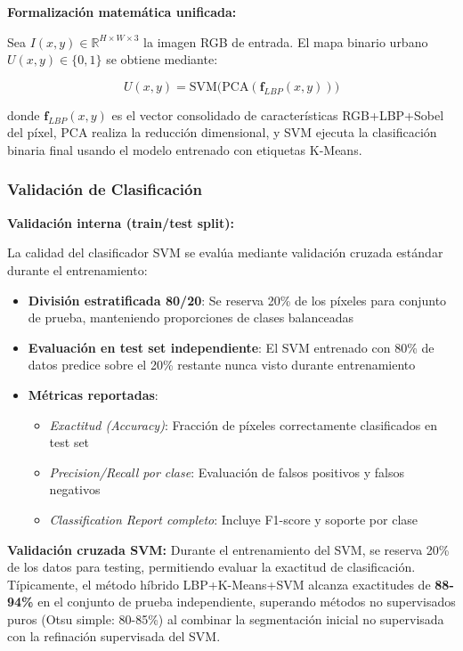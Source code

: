 \textbf{Formalización matemática unificada:}

Sea $I(x,y) \in \mathbb{R}^{H \times W \times 3}$ la imagen RGB de entrada. El mapa binario urbano $U(x,y) \in \{0,1\}$ se obtiene mediante:

\begin{equation}
U(x,y) = \text{SVM}\big(\text{PCA}(\mathbf{f}_{LBP}(x,y))\big)
\label{eq:binary_classification}
\end{equation}

donde $\mathbf{f}_{LBP}(x,y)$ es el vector consolidado de características RGB+LBP+Sobel del píxel, PCA realiza la reducción dimensional, y SVM ejecuta la clasificación binaria final usando el modelo entrenado con etiquetas K-Means.

\subsubsection{Validación de Clasificación}


\textbf{Validación interna (train/test split):}

La calidad del clasificador SVM se evalúa mediante validación cruzada estándar durante el entrenamiento:

\begin{itemize}[itemsep=2pt]
	\item \textbf{División estratificada 80/20}: Se reserva 20\% de los píxeles para conjunto de prueba, manteniendo proporciones de clases balanceadas
	\item \textbf{Evaluación en test set independiente}: El SVM entrenado con 80\% de datos predice sobre el 20\% restante nunca visto durante entrenamiento
	\item \textbf{Métricas reportadas}: 
	\begin{itemize}[itemsep=1pt]
		\item \textit{Exactitud (Accuracy)}: Fracción de píxeles correctamente clasificados en test set
		\item \textit{Precision/Recall por clase}: Evaluación de falsos positivos y falsos negativos
		\item \textit{Classification Report completo}: Incluye F1-score y soporte por clase
	\end{itemize}
\end{itemize}

\textbf{Validación cruzada SVM:} Durante el entrenamiento del SVM, se reserva 20\% de los datos para testing, permitiendo evaluar la exactitud de clasificación. Típicamente, el método híbrido LBP+K-Means+SVM alcanza exactitudes de \textbf{88-94\%} en el conjunto de prueba independiente, superando métodos no supervisados puros (Otsu simple: 80-85\%) al combinar la segmentación inicial no supervisada con la refinación supervisada del SVM.

